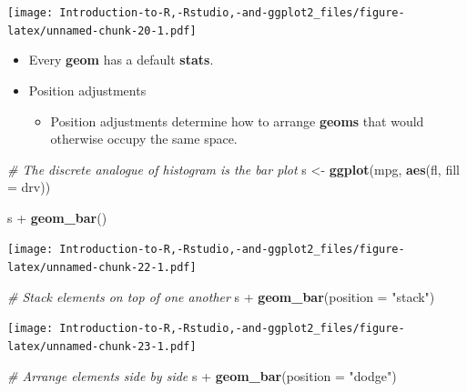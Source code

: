 \documentclass[]{book}
\newenvironment{Shaded}{\begin{snugshade}}{\end{snugshade}}
\newcommand{\KeywordTok}[1]{\textcolor[rgb]{0.13,0.29,0.53}{\textbf{{#1}}}}
\newcommand{\DataTypeTok}[1]{\textcolor[rgb]{0.13,0.29,0.53}{{#1}}}
\newcommand{\StringTok}[1]{\textcolor[rgb]{0.31,0.60,0.02}{{#1}}}
\newcommand{\CommentTok}[1]{\textcolor[rgb]{0.56,0.35,0.01}{\textit{{#1}}}}
\newcommand{\NormalTok}[1]{{#1}}
\providecommand{\tightlist}{%
  \setlength{\itemsep}{0pt}\setlength{\parskip}{0pt}}
\begin{document}
\texttt{[image: Introduction-to-R,-Rstudio,-and-ggplot2\_files/figure-latex/unnamed-chunk-20-1.pdf]}

\begin{itemize}
\item
  Every \textbf{geom} has a default \textbf{stats}.
\item
  Position adjustments

  \begin{itemize}
  \tightlist
  \item
    Position adjustments determine how to arrange \textbf{geoms} that
    would otherwise occupy the same space.
  \end{itemize}
\end{itemize}

\begin{Shaded}
\begin{Highlighting}[]
\CommentTok{# The discrete analogue of histogram is the bar plot}
\NormalTok{s <-}\StringTok{ }\KeywordTok{ggplot}\NormalTok{(mpg, }\KeywordTok{aes}\NormalTok{(fl, }\DataTypeTok{fill =} \NormalTok{drv))}
\end{Highlighting}
\end{Shaded}

\begin{Shaded}
\begin{Highlighting}[]
\NormalTok{s +}\StringTok{ }\KeywordTok{geom_bar}\NormalTok{()}
\end{Highlighting}
\end{Shaded}

\texttt{[image: Introduction-to-R,-Rstudio,-and-ggplot2\_files/figure-latex/unnamed-chunk-22-1.pdf]}

\begin{Shaded}
\begin{Highlighting}[]
\CommentTok{# Stack elements on top of one another}
\NormalTok{s +}\StringTok{ }\KeywordTok{geom_bar}\NormalTok{(}\DataTypeTok{position =} \StringTok{"stack"}\NormalTok{)}
\end{Highlighting}
\end{Shaded}

\texttt{[image: Introduction-to-R,-Rstudio,-and-ggplot2\_files/figure-latex/unnamed-chunk-23-1.pdf]}

\begin{Shaded}
\begin{Highlighting}[]
\CommentTok{# Arrange elements side by side}
\NormalTok{s +}\StringTok{ }\KeywordTok{geom_bar}\NormalTok{(}\DataTypeTok{position =} \StringTok{"dodge"}\NormalTok{)}
\end{Highlighting}
\end{Shaded}
\end{document}
